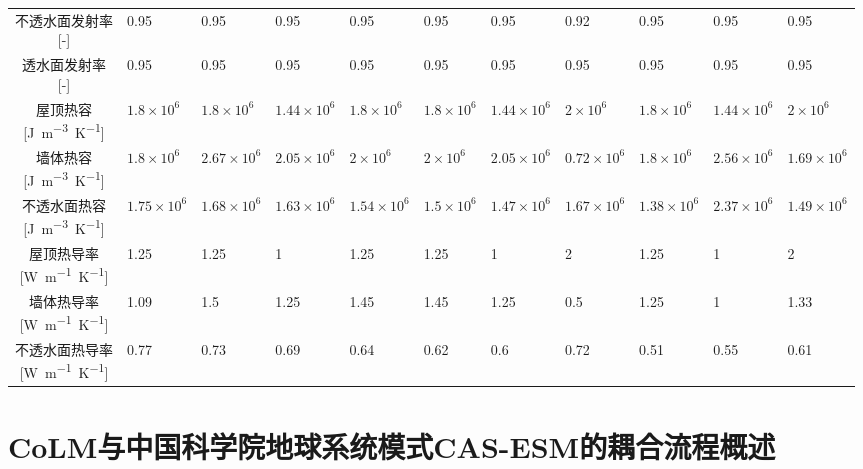 \begin{landscape}
\begin{table}[htbp]
\begin{tabular}{@{}cllllllllll@{}}
    \makecell{不透水面发射率\\{[-]}}& 0.95 & 0.95 & 0.95 & 0.95 & 0.95 & 0.95 & 0.92 & 0.95 & 0.95 & 0.95 \\
    \makecell{透水面发射率\\{[-]}} & 0.95 & 0.95 & 0.95 & 0.95 & 0.95 & 0.95 & 0.95 & 0.95 & 0.95 & 0.95  \\
    \makecell{屋顶热容\\{[\unit{J.m^{-3}.K^{-1}}]}}   &$ 1.8\times 10^{6}$ &$ 1.8\times 10^{6}$ & $1.44\times 10^{6}$&$ 1.8\times 10^{6}$ &$ 1.8\times 10^{6}$ &$ 1.44\times 10^{6}$&$ 2\times 10^{6}$    & $1.8\times 10^{6}$ & $1.44\times 10^{6}$&$ 2\times 10^{6}$   \\
    \makecell{墙体热容\\{[\unit{J.m^{-3}.K^{-1}}]}}   &$ 1.8\times 10^{6}$ &$ 2.67\times 10^{6}$& $2.05\times 10^{6}$&$ 2\times 10^{6}$   &$ 2\times 10^{6}$   &$ 2.05\times 10^{6}$&$ 0.72\times 10^{6}$ & $1.8\times 10^{6}$ &$ 2.56\times 10^{6}$&$ 1.69\times 10^{6}$\\
    \makecell{不透水面热容\\{[\unit{J.m^{-3}.K^{-1}}]}} &$ 1.75\times 10^{6}$&$ 1.68\times 10^{6}$& $1.63\times 10^{6}$& $1.54\times 10^{6}$& $1.5\times 10^{6}$ &$ 1.47\times 10^{6}$&$ 1.67\times 10^{6}$& $1.38\times 10^{6}$&$ 2.37\times 10^{6}$& $1.49\times 10^{6}$\\
    \makecell{屋顶热导率\\{[\unit{W.m^{-1}.K^{-1}}]}}  & 1.25 & 1.25 & 1   & 1.25 & 1.25 & 1   & 2   & 1.25 & 1   & 2   \\
    \makecell{墙体热导率\\{[\unit{W.m^{-1}.K^{-1}}]}}  & 1.09 & 1.5  & 1.25 & 1.45 & 1.45 & 1.25 & 0.5  & 1.25 & 1   & 1.33 \\
    \makecell{不透水面热导率\\{[\unit{W.m^{-1}.K^{-1}}]}}& 0.77 & 0.73 & 0.69 & 0.64 & 0.62 & 0.6  & 0.72 & 0.51 & 0.55 & 0.61 \\ \bottomrule
    \end{tabular}
\end{table}
\end{landscape}

\chapter{CoLM与中国科学院地球系统模式CAS-ESM的耦合流程概述}\label{CoLM与CAS-ESM的耦合}

